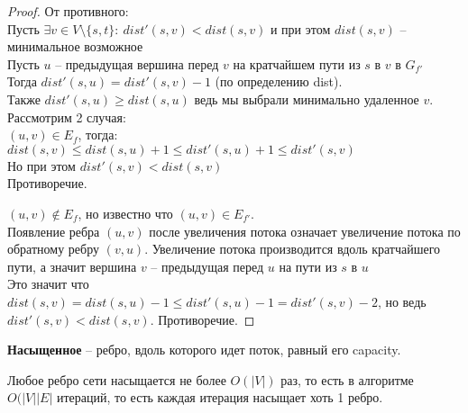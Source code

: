 \begin{proof} От противного: \\
	Пусть $\exists v \in V \setminus \{s, t\}:\ dist'(s, v) < dist(s, v)$ и при этом $dist(s, v)$ -- минимальное возможное \\
	Пусть $u$ -- предыдущая вершина перед  $v$	на кратчайшем пути из $s$ в  $v$ в $G_{f'}$ \\
	Тогда $dist'(s, u) = dist'(s, v) - 1$ (по определению dist). \\
	Также $dist'(s,u) \geq dist(s, u)$ ведь мы выбрали минимально удаленное $v$.\\
	Рассмотрим 2 случая: \\
		$(u, v) \in E_f$, тогда: \\
			$dist(s, v) \leq dist(s, u) + 1 \leq dist'(s, u) + 1 \leq dist'(s, v)$ \\
			Но при этом $dist'(s, v) < dist(s, v)$ \\
			Противоречие.
		
			$(u, v) \notin E_f$, но известно что $(u, v) \in E_{f'}$.\\
			Появление ребра $(u,v)$ после увеличения потока означает увеличение потока по обратному ребру $(v,u)$. Увеличение потока производится вдоль кратчайшего пути, а значит вершина  $v$ -- предыдущая перед  $u$ на пути из  $s$ в  $u$\\
			Это значит что  $dist(s, v) = dist(s, u) - 1 \leq dist'(s, u) - 1 = dist'(s, v) - 2$, но ведь $dist'(s, v) < dist(s, v)$. Противоречие.

\end{proof}

\begin{Def}
	\textbf{Насыщенное} -- ребро, вдоль которого идет поток, равный его capacity.
\end{Def}

\begin{lemma}
	Любое ребро сети насыщается не более $O(\lvert V \rvert)$ раз, то есть в алгоритме $O(\lvert V \rvert \lvert E \rvert$ итераций, то есть каждая итерация насыщает хоть 1 ребро.
\end{lemma}

